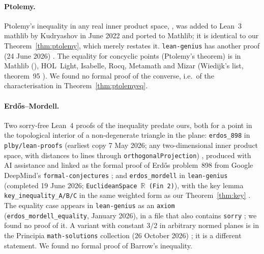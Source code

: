 \documentclass[11pt]{article}
\theoremstyle{definition}
\theoremstyle{remark}
\newcommand{\lean}[1]{\texttt{#1}}
\begin{document}
\paragraph{Ptolemy.} Ptolemy's inequality in any real inner product space,
, was added to Lean~3 mathlib by
Kudryashov in June 2022 and ported to Mathlib; it is identical to our Theorem~\ref{thm:ptolemy},
which merely restates it. \lean{lean-genius} has another proof (24 June 2026) \cite{lgptolemy}. The
equality for concyclic points (Ptolemy's theorem) is in Mathlib
(), HOL~Light, Isabelle,
Rocq, Metamath and Mizar (Wiedijk's list, theorem~95 \cite{wiedijk100}). We found no formal proof of
the converse, i.e.\ of the characterisation in Theorem~\ref{thm:ptolemyeq}.

\paragraph{Erdős--Mordell.} Two sorry-free Lean~4 proofs of the inequality predate ours, both for a
point in the topological interior of a non-degenerate triangle in the plane: \lean{erdos\_898} in
\lean{plby/lean-proofs} (earliest copy 7 May 2026; any two-dimensional inner product space, with
distances to lines through \lean{orthogonalProjection}) \cite{plby}, produced with AI assistance and
linked as the formal proof of Erdős problem~898 from Google DeepMind's \lean{formal-conjectures}
\cite{formalconj}; and \lean{erdos\_mordell} in \lean{lean-genius} (completed 19 June 2026;
\lean{EuclideanSpace \(\mathbb{R}\) (Fin 2)}), with the key lemma
\lean{key\_inequality\_A/B/C} in the same weighted form as our Theorem~\ref{thm:key}
\cite{lgmordell}. The equality case appears in \lean{lean-genius} as an \lean{axiom}
(\lean{erdos\_mordell\_equality}, January 2026), in a file that also contains \lean{sorry}
\cite{lg898}; we found no proof of it. A variant with constant $3/2$ in arbitrary normed planes is in
the Principia \lean{math-solutions} collection (26 October 2026) \cite{principia}; it is a different
statement. We found no formal proof of Barrow's inequality.
\end{document}
